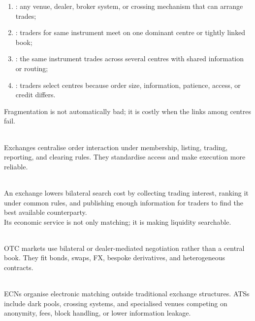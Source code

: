 \begin{taxonomy} 
\begin{enumerate}[label=\roman*.]
\setlength{\itemsep}{0pt}
\item {}: any venue, dealer, broker system, or crossing mechanism that can arrange trades;
\item {}: traders for same instrument meet on one dominant centre or tightly linked book;
\item {}: the same instrument trades across several centres with shared information or routing;
\item {}: traders select centres because order size, information, patience, access, or credit differs.
\end{enumerate}
Fragmentation is not automatically bad; it is costly when the links among centres fail.
\end{taxonomy}

\begin{definition} \\
Exchanges centralise order interaction under membership, listing, trading, reporting, and clearing rules. They standardise access and make execution more reliable.
\end{definition}

\begin{mechanism} \\
An exchange lowers bilateral search cost by collecting trading interest, ranking it under common rules, and publishing enough information for traders to find the best available counterparty.\\
Its economic service is not only matching; it is making liquidity searchable.
\end{mechanism}

\begin{definition} \\
OTC markets use bilateral or dealer-mediated negotiation rather than a central book. They fit bonds, swaps, FX, bespoke derivatives, and heterogeneous contracts.
\end{definition}

\begin{taxonomy} \\
ECNs organise electronic matching outside traditional exchange structures. ATSs include dark pools, crossing systems, and specialised venues competing on anonymity, fees, block handling, or lower information leakage.
\end{taxonomy}

